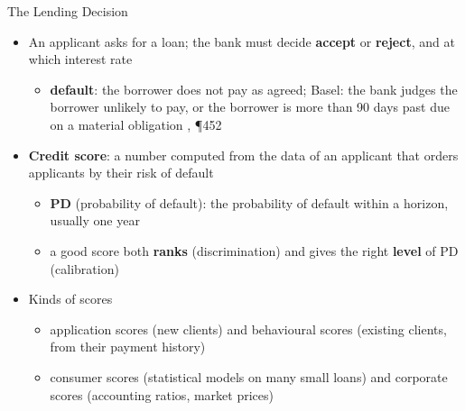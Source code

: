 \begin{frame}{The Lending Decision}
\itemsize{\small}
\begin{itemize}
    \item An applicant asks for a loan; the bank must decide \textbf{accept} or \textbf{reject}, and at which interest rate
    \begin{itemize}
        \item \textbf{default}: the borrower does not pay as agreed; Basel: the bank judges the borrower unlikely to pay, or the borrower is more than 90 days past due on a material obligation , ¶452
    \end{itemize}
    \item \textbf{Credit score}: a number computed from the data of an applicant that orders applicants by their risk of default
    \begin{itemize}
        \item \textbf{PD} (probability of default): the probability of default within a horizon, usually one year
        \item a good score both \textbf{ranks} (discrimination) and gives the right \textbf{level} of PD (calibration)
    \end{itemize}
    \item Kinds of scores
    \begin{itemize}
        \item application scores (new clients) and behavioural scores (existing clients, from their payment history)
        \item consumer scores (statistical models on many small loans) and corporate scores (accounting ratios, market prices)
    \end{itemize}
\end{itemize}
\end{frame}

